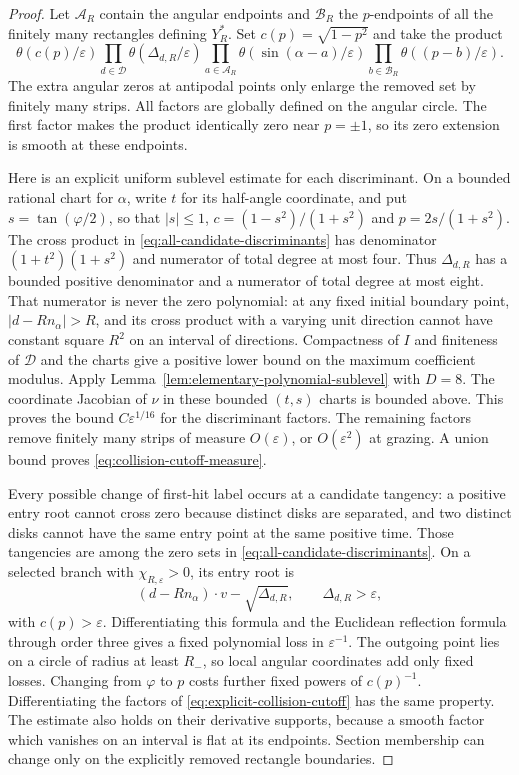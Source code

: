 \begin{proof}
Let $\mathcal A_R$ contain the angular endpoints and $\mathcal B_R$ the
$p$-endpoints of all the finitely many rectangles defining $Y_R^*$.
Set $c(p)=\sqrt{1-p^2}$ and take the product
\begin{equation}\label{eq:explicit-collision-cutoff}
 \theta(c(p)/\varepsilon)
 \prod_{d\in\mathcal D}\theta(\Delta_{d,R}/\varepsilon)
 \prod_{a\in\mathcal A_R}\theta(\sin(\alpha-a)/\varepsilon)
 \prod_{b\in\mathcal B_R}\theta((p-b)/\varepsilon).
\end{equation}
The extra angular zeros at antipodal points only enlarge the removed
set by finitely many strips. All factors are globally defined on the
angular circle. The first factor makes the product identically zero
near $p=\pm1$, so its zero extension is smooth at these endpoints.

Here is an explicit uniform sublevel estimate for each discriminant.
On a bounded rational chart for $\alpha$, write $t$ for its half-angle
coordinate, and put $s=\tan(\varphi/2)$, so that $|s|\le1$,
$c=(1-s^2)/(1+s^2)$ and $p=2s/(1+s^2)$. The cross product in
\eqref{eq:all-candidate-discriminants} has denominator
$(1+t^2)(1+s^2)$ and numerator of total degree at most four. Thus
$\Delta_{d,R}$ has a bounded positive denominator and a numerator of
total degree at most eight. That numerator is never the zero
polynomial: at any fixed initial boundary point, $|d-Rn_\alpha|>R$,
and its cross product with a varying unit direction cannot have
constant square $R^2$ on an interval of directions. Compactness of $I$
and finiteness of $\mathcal D$ and the charts give a positive lower
bound on the maximum coefficient modulus. Apply
Lemma~\ref{lem:elementary-polynomial-sublevel} with $D=8$.
The coordinate Jacobian of $\nu$ in these bounded $(t,s)$ charts is
bounded above. This proves the bound $C\varepsilon^{1/16}$ for the
discriminant factors. The remaining factors remove finitely many
strips of measure $O(\varepsilon)$, or $O(\varepsilon^2)$ at grazing.
A union bound proves \eqref{eq:collision-cutoff-measure}.

Every possible change of first-hit label occurs at a candidate
tangency: a positive entry root cannot cross zero because distinct
disks are separated, and two distinct disks cannot have the same
entry point at the same positive time. Those tangencies are among the
zero sets in \eqref{eq:all-candidate-discriminants}. On a selected
branch with $\chi_{R,\varepsilon}>0$, its entry root is
\[
 (d-Rn_\alpha)\cdot v-\sqrt{\Delta_{d,R}},
 \qquad \Delta_{d,R}>\varepsilon,
\]
with $c(p)>\varepsilon$. Differentiating this formula and the Euclidean
reflection formula through order three gives a fixed polynomial loss
in $\varepsilon^{-1}$. The outgoing point lies on a circle of radius
at least $R_-$, so local angular coordinates add only fixed losses.
Changing from $\varphi$ to $p$ costs further fixed powers of
$c(p)^{-1}$. Differentiating the factors of
\eqref{eq:explicit-collision-cutoff} has the same property. The estimate
also holds on their derivative supports, because a smooth factor which
vanishes on an interval is flat at its endpoints. Section membership
can change only on the explicitly removed rectangle boundaries.
\end{proof}


